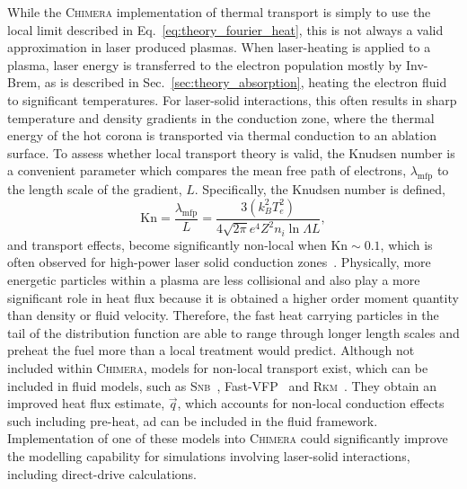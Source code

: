 While the \textsc{Chimera} implementation of thermal transport is simply to use the local limit described in Eq.~\ref{eq:theory_fourier_heat}, this is not always a valid approximation in laser produced plasmas.
When laser-heating is applied to a plasma, laser energy is transferred to the electron population mostly by \ac{Inv-Brem}, as is described in Sec.~\ref{sec:theory_absorption}, heating the electron fluid to significant temperatures.
For laser-solid interactions, this often results in sharp temperature and density gradients in the conduction zone, where the thermal energy of the hot corona is transported via thermal conduction to an ablation surface.
To assess whether local transport theory is valid, the Knudsen number is a convenient parameter which compares the mean free path of electrons, $\lambda_{\text{mfp}}$ to the length scale of the gradient, $L$.
Specifically, the Knudsen number is defined,
\begin{equation}
    \text{Kn} = \frac{\lambda_{\text{mfp}}}{L} = \frac{3 (k_B^2 T_e^2)}{4 \sqrt{2\pi} e^4 Z^2 n_i \ln{\Lambda} L},
\end{equation}
and transport effects, become significantly non-local when $\text{Kn}\sim0.1$, which is often observed for high-power laser solid conduction zones~\cite{yuan_spacetime_2024}.
Physically, more energetic particles within a plasma are less collisional and also play a more significant role in heat flux because it is obtained a higher order moment quantity than density or fluid velocity.
Therefore, the fast heat carrying particles in the tail of the distribution function are able to range through longer length scales and preheat the fuel more than a local treatment would predict.
Although not included within \textsc{Chimera}, models for non-local transport exist, which can be included in fluid models, such as \textsc{Snb}~\cite{schurtz_nonlocal_2000,nicolai_practical_2006,cao_improved_2015,sherlock_comparison_2017}, Fast-\textsc{VFP}~\cite{bell_fast_2024} and \textsc{Rkm}~\cite{mitchell_reduced_2024}.
They obtain an improved heat flux estimate, $\vec{q}$, which accounts for non-local conduction effects such including pre-heat, ad can be included in the fluid framework.
Implementation of one of these models into \textsc{Chimera} could significantly improve the modelling capability for simulations involving laser-solid interactions, including direct-drive calculations.

